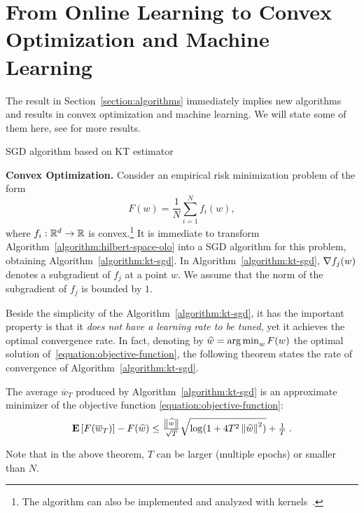 \section{From Online Learning to Convex Optimization and Machine Learning}
\label{section:applications}

The result in Section~\ref{section:algorithms} immediately implies new
algorithms and results in convex optimization and machine learning. We will state some of them here, see
\cite{Orabona-2014} for more results.

\begin{algorithm}[t]
\caption{SGD algorithm based on KT estimator \label{algorithm:kt-sgd}}
\begin{algorithmic}[1]
{
\ENDFOR
{}
}
\end{algorithmic}
\end{algorithm}

\textbf{Convex Optimization.}
Consider an empirical risk minimization problem of the form
%
\begin{equation}
\label{equation:objective-function}
F(w) = \frac{1}{N} \sum_{i=1}^N f_i(w),
\end{equation}
%
where $f_i:\mathbb{R}^d \to \mathbb{R}$ is convex.\footnote{The algorithm can also be
implemented and analyzed with kernels~\citep{Orabona-2014}.} It is immediate to
transform Algorithm~\ref{algorithm:hilbert-space-olo} into a \ac{SGD} algorithm
for this problem, obtaining Algorithm~\ref{algorithm:kt-sgd}.
In Algorithm~\ref{algorithm:kt-sgd}, $\nabla f_j(w)$
denotes a subgradient of $f_j$ at a point $w$.  We assume that the
norm of the subgradient of $f_j$ is bounded by $1$.

Beside the simplicity of the Algorithm~\ref{algorithm:kt-sgd}, it has the
important property is that it \emph{does not have a learning rate to be tuned},
yet it achieves the optimal convergence rate. In fact, denoting by $\widehat{w} = \operatorname*{arg\,min}_w F(w)$
the optimal solution of~\eqref{equation:objective-function}, the following
theorem states the rate of convergence of Algorithm~\ref{algorithm:kt-sgd}.
%
\begin{theorem}
The average $\overline{w}_T$ produced by Algorithm~\ref{algorithm:kt-sgd} is
an approximate minimizer of the objective function \eqref{equation:objective-function}:
\[
\operatorname*{\mathbf{E}}\left[F(\overline{w}_T)\right] - F(\widehat{w}) \leq \tfrac{\left\|{\widehat{w}}\right\|}{\sqrt{T}} \sqrt{\log(1+4 T^2 \left\|{\widehat{w}}\right\|^2)} +\tfrac{1}{T} \; .
\]
\end{theorem}
%
Note that in the above theorem, $T$ can be larger (multiple epochs) or smaller
than $N$.

